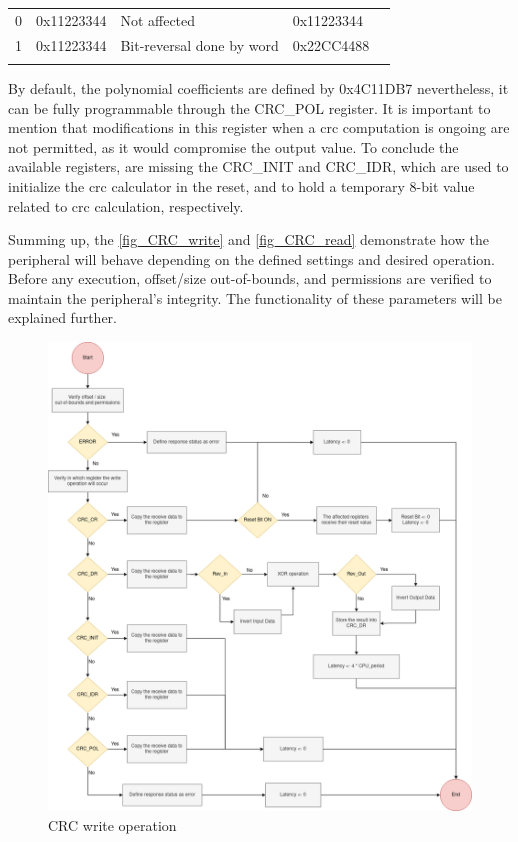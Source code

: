 \begin{table}[!htb]
\begin{minipage}{.5\linewidth}
{\begin{tabular}{lllll}
		\multicolumn{1}{|l|}{0} & \multicolumn{1}{l|}{0x11223344} & \multicolumn{1}{l|}{Not affected} & \multicolumn{1}{l|}{0x11223344} &  \\ \cline{1-4}
		\multicolumn{1}{|l|}{1} & \multicolumn{1}{l|}{0x11223344} & \multicolumn{1}{l|}{Bit-reversal done by word} & \multicolumn{1}{l|}{0x22CC4488} &  \\ \cline{1-4}
		 &  &  &  & 
		\end{tabular}%
        }   
        \label{tab:CRC_REV_OUT}
    \end{minipage}
	\label{tab:CRC_REV} 
\end{table}

By default, the polynomial coefficients are defined by 0x4C11DB7 nevertheless, it can be fully programmable through the CRC\_POL register.
It is important to mention that modifications in this register when a \gls*{crc} computation is ongoing are not permitted, as it would 
compromise the output value. To conclude the available registers, are missing the CRC\_INIT and CRC\_IDR, which are used to initialize 
the \gls*{crc} calculator in the reset, and to hold a temporary 8-bit value related to \gls*{crc} calculation, respectively. 

Summing up, the \autoref{fig_CRC_write} and \autoref{fig_CRC_read} demonstrate how the peripheral will behave depending on the defined settings and desired 
operation. Before any execution, offset/size out-of-bounds, and permissions are verified to maintain the peripheral's integrity. The 
functionality of these parameters will be explained further. 

\begin{figure}[]
	\centering
 	\includegraphics[width=0.6\linewidth]{Images/CRC_write.png}
 	\caption{CRC write operation}
	 \label{fig_CRC_write}
\end{figure}

